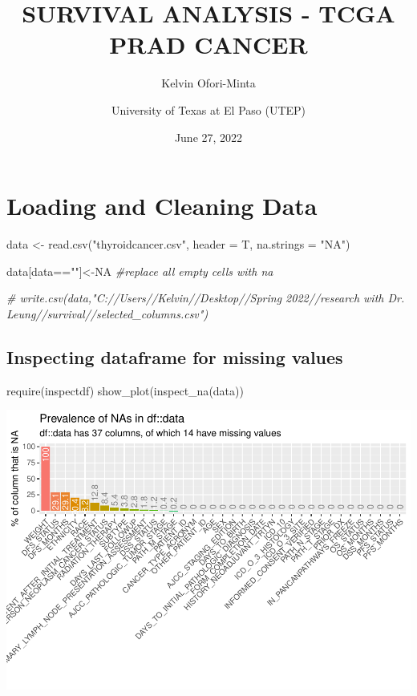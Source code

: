 \documentclass[
  11pt,
]{article}
\title{SURVIVAL ANALYSIS - TCGA PRAD CANCER}
\author{Kelvin Ofori-Minta \and University of Texas at El Paso (UTEP)}
\date{June 27, 2022}
\newenvironment{Shaded}{\begin{snugshade}}{\end{snugshade}}
\newcommand{\AttributeTok}[1]{\textcolor[rgb]{0.77,0.63,0.00}{#1}}
\newcommand{\CommentTok}[1]{\textcolor[rgb]{0.56,0.35,0.01}{\textit{#1}}}
\newcommand{\ConstantTok}[1]{\textcolor[rgb]{0.00,0.00,0.00}{#1}}
\newcommand{\FunctionTok}[1]{\textcolor[rgb]{0.00,0.00,0.00}{#1}}
\newcommand{\NormalTok}[1]{#1}
\newcommand{\OtherTok}[1]{\textcolor[rgb]{0.56,0.35,0.01}{#1}}
\newcommand{\SpecialCharTok}[1]{\textcolor[rgb]{0.00,0.00,0.00}{#1}}
\newcommand{\StringTok}[1]{\textcolor[rgb]{0.31,0.60,0.02}{#1}}
\begin{document}
\maketitle

{
\setcounter{tocdepth}{4}
\tableofcontents
}
\section{Loading and Cleaning Data}

\begin{Shaded}
\begin{Highlighting}[]
\NormalTok{data }\OtherTok{\textless{}{-}} \FunctionTok{read.csv}\NormalTok{(}\StringTok{"thyroidcancer.csv"}\NormalTok{, }\AttributeTok{header =}\NormalTok{ T, }\AttributeTok{na.strings =} \StringTok{"NA"}\NormalTok{)}

\NormalTok{data[data}\SpecialCharTok{==}\StringTok{""}\NormalTok{]}\OtherTok{\textless{}{-}}\ConstantTok{NA} \CommentTok{\#replace all empty cells with na}

\CommentTok{\# write.csv(data,"C://Users//Kelvin//Desktop//Spring 2022//research with Dr. Leung//survival//selected\_columns.csv")}
\end{Highlighting}
\end{Shaded}

\subsection{Inspecting dataframe for missing values}

\begin{Shaded}
\begin{Highlighting}[]
\FunctionTok{require}\NormalTok{(inspectdf)}
\FunctionTok{show\_plot}\NormalTok{(}\FunctionTok{inspect\_na}\NormalTok{(data))}
\end{Highlighting}
\end{Shaded}

\includegraphics{thyroid_1_files/figure-latex/unnamed-chunk-2-1.pdf}
\end{document}
